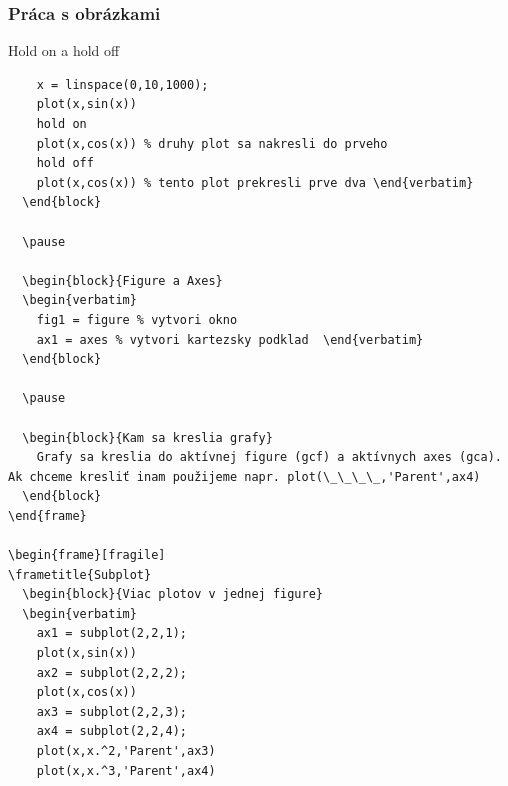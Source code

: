 \documentclass{beamer}
\begin{document}
\begin{frame}[fragile]
\frametitle{Práca s obrázkami}
  \begin{block}{Hold on a hold off}
  \begin{verbatim}
    x = linspace(0,10,1000);    
    plot(x,sin(x))
    hold on
    plot(x,cos(x)) % druhy plot sa nakresli do prveho
    hold off 
    plot(x,cos(x)) % tento plot prekresli prve dva \end{verbatim}
  \end{block}
  
  \pause
  
  \begin{block}{Figure a Axes}
  \begin{verbatim}
    fig1 = figure % vytvori okno
    ax1 = axes % vytvori kartezsky podklad  \end{verbatim}
  \end{block}
  
  \pause
  
  \begin{block}{Kam sa kreslia grafy}
    Grafy sa kreslia do aktívnej figure (gcf) a aktívnych axes (gca). Ak chceme kresliť inam použijeme napr. plot(\_\_\_\_,'Parent',ax4)
  \end{block}
\end{frame}

\begin{frame}[fragile]
\frametitle{Subplot}
  \begin{block}{Viac plotov v jednej figure}
  \begin{verbatim}
    ax1 = subplot(2,2,1);
    plot(x,sin(x))       
    ax2 = subplot(2,2,2);
    plot(x,cos(x))
    ax3 = subplot(2,2,3);
    ax4 = subplot(2,2,4);
    plot(x,x.^2,'Parent',ax3)
    plot(x,x.^3,'Parent',ax4) \end{verbatim}
  \end{block}
\end{frame}
\end{document}

